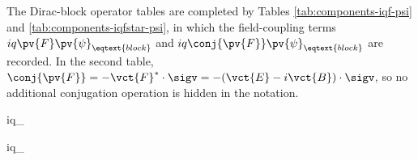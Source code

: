 \noindent The Dirac-block operator tables are completed by Tables
\ref{tab:components-iqf-psi} and \ref{tab:components-iqfstar-psi}, in which
the field-coupling terms \(iq\pv{F}\pv{\psi}_{\eqtext{block}}\) and
\(iq\conj{\pv{F}}\pv{\psi}_{\eqtext{block}}\) are recorded. In the second table,
\(\conj{\pv{F}}=-\vct{F}^{*}\cdot\sigv
=-(\vct{E}-i\vct{B})\cdot\sigv\), so no additional conjugation operation is
hidden in the notation.
\begin{componenttable}{iq\pv{\psi}_{}}
\end{componenttable}

\begin{componenttable}{iq\pv{\psi}_{}}
\end{componenttable}
